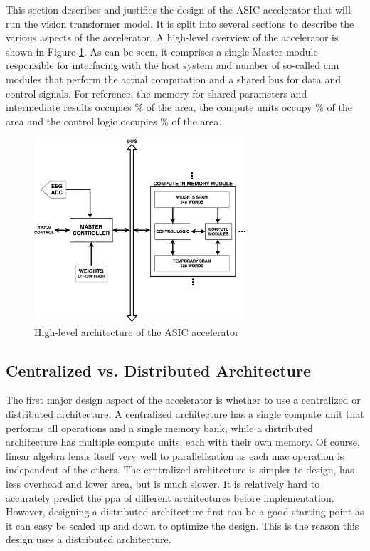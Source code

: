 This section describes and justifies the design of the ASIC accelerator that will run the vision transformer model. It is split into several sections to describe the
various aspects of the accelerator. A high-level overview of the accelerator is shown in Figure \ref{fig:high_level_arch}. As can be seen, it comprises a single Master
module responsible for interfacing with the host system and number of so-called \ac{cim} modules that perform the actual computation and a shared bus for data and control
signals. For reference, the memory for shared parameters and intermediate results occupies \percentmem{}\% of the area, the compute units occupy \percentcompute{}\% of
the area and the control logic occupies \percentlogic{}\% of the area.

\begin{figure}
    \centering
    \includegraphics[width=0.7\textwidth]{assets/high_level_arch.png}
    \caption{High-level architecture of the ASIC accelerator}
    \label{fig:high_level_arch}
\end{figure}

\subsection{Centralized vs. Distributed Architecture}
The first major design aspect of the accelerator is whether to use a centralized or distributed architecture. A centralized architecture has a single compute unit that
performs all operations and a single memory bank, while a distributed architecture has multiple compute units, each with their own memory. Of course, linear algebra lends
itself very well to parallelization as each \ac{mac} operation is independent of the others. The centralized architecture is simpler to design, has less overhead and lower
area, but is much slower. It is relatively hard to accurately predict the \ac{ppa} of different architectures before implementation. However, designing a distributed
architecture first can be a good starting point as it can easy be scaled up and down to optimize the design. This is the reason this design uses a distributed architecture.


